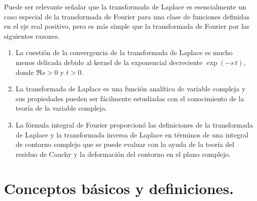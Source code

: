 \par
Puede ser relevante señalar que la transformada de Laplace es esencialmente un caso especial de la transformada de Fourier para una clase de funciones definidas en el eje real positivo, pero es más simple que la transformada de Fourier por las siguientes razones.
\begin{enumerate}
\item La cuestión de la convergencia de la transformada de Laplace es mucho menos delicada debido al kernel de la exponencial decreciente $\exp (-s \, t)$, donde $\Re{s} > 0$ y $t > 0$.
\item La transformada de Laplace es una función analítica de variable compleja y sus propiedades pueden ser fácilmente estudiadas con el conocimiento de la teoría de la variable compleja.
\item La fórmula integral de Fourier proporcionó las definiciones de la transformada de Laplace y la transformada inversa de Laplace en términos de una integral de contorno complejo que se puede evaluar con la ayuda de la teoría del residuo de Cauchy y la deformación del contorno en el plano complejo.
\end{enumerate}

\section{Conceptos básicos y definiciones.}

